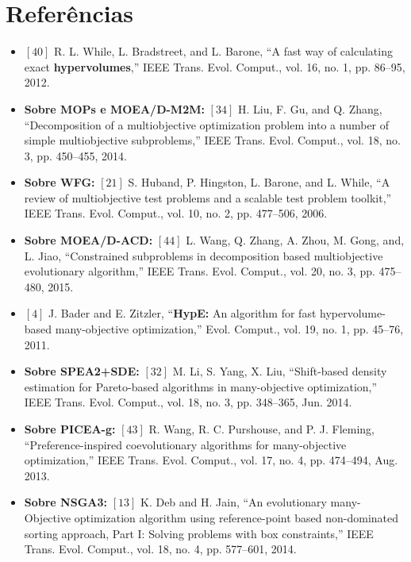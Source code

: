 \documentclass{rbfin}
\begin{document}
\newpage
\section{Referências}

\vspace{6mm}

\begin{itemize}
  \item $[40]$ R. L. While, L. Bradstreet, and L. Barone, “A fast way of calculating exact \textbf{hypervolumes},” IEEE Trans. Evol. Comput., vol. 16, no. 1, pp. 86–95, 2012.
  \item \textbf{Sobre MOPs e MOEA/D-M2M:} $[34]$ H. Liu, F. Gu, and Q. Zhang, “Decomposition of a multiobjective optimization problem into a number of simple multiobjective subproblems,” IEEE Trans. Evol. Comput., vol. 18, no. 3, pp. 450–455, 2014.
  \item \textbf{Sobre WFG:} $[21]$ S. Huband, P. Hingston, L. Barone, and L. While, “A review of multiobjective test problems and a scalable test problem toolkit,” IEEE Trans. Evol. Comput., vol. 10, no. 2, pp. 477–506, 2006.
  \item \textbf{Sobre MOEA/D-ACD:} $[44]$ L. Wang, Q. Zhang, A. Zhou, M. Gong, and, L. Jiao, “Constrained subproblems in decomposition based multiobjective evolutionary algorithm,” IEEE Trans. Evol. Comput., vol. 20, no. 3, pp. 475–480, 2015.
  \item $[4]$ J. Bader and E. Zitzler, “\textbf{HypE:} An algorithm for fast hypervolume-based many-objective optimization,” Evol. Comput., vol. 19, no. 1, pp. 45–76, 2011.
  \item \textbf{Sobre SPEA2+SDE:} $[32]$ M. Li, S. Yang, X. Liu, “Shift-based density estimation for Pareto-based algorithms in many-objective optimization,” IEEE Trans. Evol. Comput., vol. 18, no. 3, pp. 348–365, Jun. 2014.
  \item \textbf{Sobre PICEA-g:} $[43]$ R. Wang, R. C. Purshouse, and P. J. Fleming, “Preference-inspired coevolutionary algorithms for many-objective optimization,” IEEE Trans. Evol. Comput., vol. 17, no. 4, pp. 474–494, Aug. 2013.
  \item \textbf{Sobre NSGA3:} $[13]$ K. Deb and H. Jain, “An evolutionary many-Objective optimization algorithm using reference-point based non-dominated sorting approach, Part I: Solving problems with box constraints,” IEEE Trans. Evol. Comput., vol. 18, no. 4, pp. 577–601, 2014.
\end{itemize}
\end{document}
